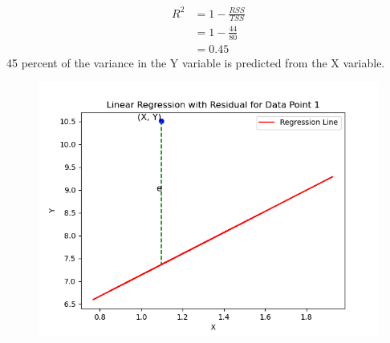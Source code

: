 \documentclass[journal,12pt,twocolumn]{IEEEtran}
\theoremstyle{remark}
\begin{document}
\begin{align}
R^2 &= 1-\frac{RSS}{TSS}\\
&= 1-\frac{44}{80}\\
&=0.45
\end{align}
45 percent of the variance in the Y variable is predicted from the X variable.
\begin{figure}[!ht]
\centering
\includegraphics[width=\columnwidth]{2023/XH/63/figs/RSS.png}
\label{fig:xh_63.2023}
\end{figure}
\end{document}
